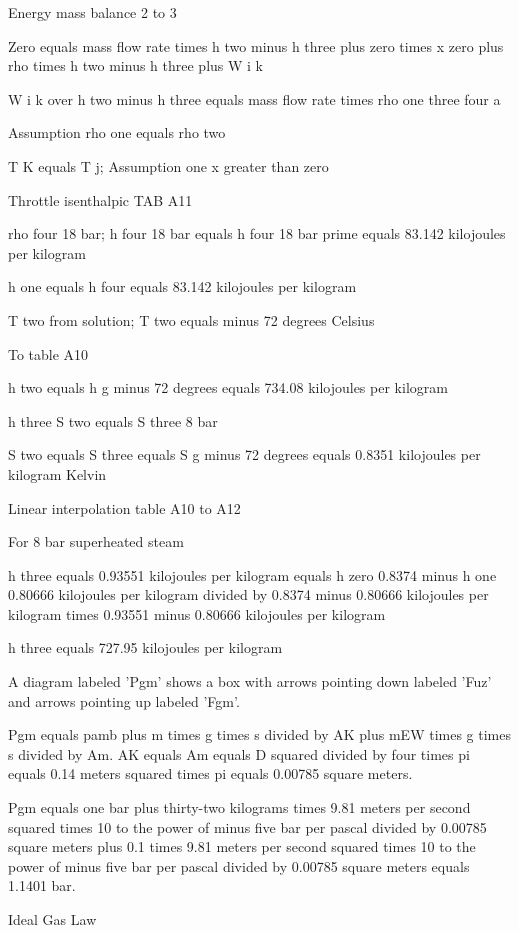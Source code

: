 Energy mass balance 2 to 3

Zero equals mass flow rate times h two minus h three plus zero times x zero plus rho times h two minus h three plus W i k

W i k over h two minus h three equals mass flow rate times rho one three four a

Assumption rho one equals rho two

T K equals T j; Assumption one x greater than zero

Throttle isenthalpic TAB A11

rho four 18 bar; h four 18 bar equals h four 18 bar prime equals 83.142 kilojoules per kilogram

h one equals h four equals 83.142 kilojoules per kilogram

T two from solution; T two equals minus 72 degrees Celsius

To table A10

h two equals h g minus 72 degrees equals 734.08 kilojoules per kilogram

h three S two equals S three 8 bar

S two equals S three equals S g minus 72 degrees equals 0.8351 kilojoules per kilogram Kelvin

Linear interpolation table A10 to A12

For 8 bar superheated steam

h three equals 0.93551 kilojoules per kilogram equals h zero 0.8374 minus h one 0.80666 kilojoules per kilogram divided by 0.8374 minus 0.80666 kilojoules per kilogram times 0.93551 minus 0.80666 kilojoules per kilogram

h three equals 727.95 kilojoules per kilogram

A diagram labeled 'Pgm' shows a box with arrows pointing down labeled 'Fuz' and arrows pointing up labeled 'Fgm'. 

Pgm equals pamb plus m times g times s divided by AK plus mEW times g times s divided by Am. AK equals Am equals D squared divided by four times pi equals 0.14 meters squared times pi equals 0.00785 square meters.

Pgm equals one bar plus thirty-two kilograms times 9.81 meters per second squared times 10 to the power of minus five bar per pascal divided by 0.00785 square meters plus 0.1 times 9.81 meters per second squared times 10 to the power of minus five bar per pascal divided by 0.00785 square meters equals 1.1401 bar.

Ideal Gas Law

